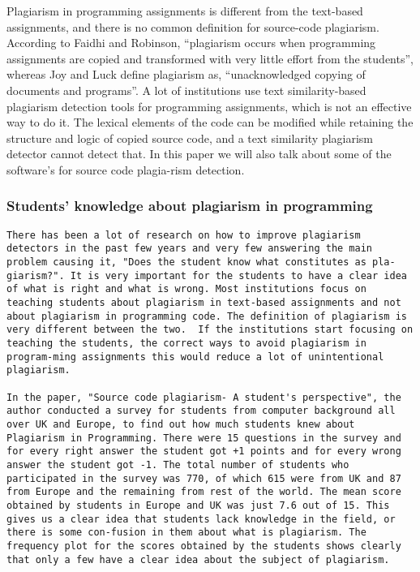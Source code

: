 \documentclass[a4paper]{article}
\begin{document}
Plagiarism in programming assignments is different from the text-based
assignments, and there is no common definition for source-code
plagiarism. According to Faidhi and Robinson, ``plagiarism occurs when
programming assignments are copied and transformed with very little
effort from the students'', whereas Joy and Luck define plagiarism as,
``unacknowledged copying of documents and programs''. A lot of
institutions use text similarity-based plagiarism detection tools for
programming assignments, which is not an effective way to do it. The
lexical elements of the code can be modified while retaining the
structure and logic of copied source code, and a text similarity
plagiarism detector cannot detect that. In this paper we will also talk
about some of the software's for source code plagia-rism detection.

\subsubsection{Students' knowledge about plagiarism in
programming}\label{students-knowledge-about-plagiarism-in-programming}

\begin{verbatim}
There has been a lot of research on how to improve plagiarism detectors in the past few years and very few answering the main problem causing it, "Does the student know what constitutes as pla-giarism?". It is very important for the students to have a clear idea of what is right and what is wrong. Most institutions focus on teaching students about plagiarism in text-based assignments and not about plagiarism in programming code. The definition of plagiarism is very different between the two.  If the institutions start focusing on teaching the students, the correct ways to avoid plagiarism in program-ming assignments this would reduce a lot of unintentional plagiarism.

In the paper, "Source code plagiarism- A student's perspective", the author conducted a survey for students from computer background all over UK and Europe, to find out how much students knew about Plagiarism in Programming. There were 15 questions in the survey and for every right answer the student got +1 points and for every wrong answer the student got -1. The total number of students who participated in the survey was 770, of which 615 were from UK and 87 from Europe and the remaining from rest of the world. The mean score obtained by students in Europe and UK was just 7.6 out of 15. This gives us a clear idea that students lack knowledge in the field, or there is some con-fusion in them about what is plagiarism. The frequency plot for the scores obtained by the students shows clearly that only a few have a clear idea about the subject of plagiarism. 
\end{verbatim}
\end{document}

